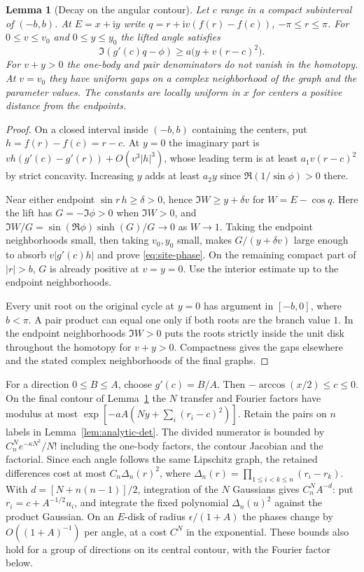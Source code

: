 \documentclass[11pt]{article}
\numberwithin{equation}{section}
\newtheorem{lemma}[theorem]{Lemma}
\theoremstyle{definition}
\newcommand{\ii}{\mathrm i}
\begin{document}
\begin{lemma}[Decay on the angular contour]\label{lem:site-contour}
Let $c$ range in a compact subinterval of $(-b,b)$. At $E=x+\ii y$
write $q=r+\ii v(f(r)-f(c))$, $-\pi\le r\le\pi$.
For $0\le v\le v_0$ and $0\le y\le y_0$ the lifted angle satisfies
\begin{equation}\label{eq:site-phase}
 \Im(g'(c)q-\phi)\ge a\bigl(y+v(r-c)^2\bigr).
\end{equation}
For $v+y>0$ the one-body and pair denominators do not vanish in the
homotopy. At $v=v_0$ they have uniform gaps on a complex neighborhood
of the graph and the parameter values. The constants are locally
uniform in $x$ for centers a positive distance from the endpoints.
\end{lemma}
\begin{proof}
On a closed interval inside $(-b,b)$ containing the centers, put
$h=f(r)-f(c)=r-c$. At $y=0$ the imaginary part is
$v h(g'(c)-g'(r))+O(v^3|h|^3)$, whose leading term is at least
$a_1v(r-c)^2$ by strict concavity. Increasing $y$ adds at least
$a_2y$ since $\Re(1/\sin\phi)>0$ there.

Near either endpoint $\sin r\,h\ge\delta>0$, hence
$\Im W\ge y+\delta v$ for $W=E-\cos q$. Here the lift has
$G=-\Im\phi>0$ when $\Im W>0$, and
$\Im W/G=\sin(\Re\phi)\sinh(G)/G\to0$ as $W\to1$.
Taking the endpoint neighborhoods small, then taking $v_0,y_0$ small,
makes $G/(y+\delta v)$ large enough to absorb $v|g'(c)h|$ and prove
\eqref{eq:site-phase}. On the remaining compact part of $|r|>b$,
$G$ is already positive at $v=y=0$. Use the interior estimate up
to the endpoint neighborhoods.

Every unit root on the original cycle at $y=0$ has argument in
$[-b,0]$, where $b<\pi$. A pair product can equal one only if both
roots are the branch value $1$. In the endpoint neighborhoods $\Im W>0$
puts the roots strictly inside the unit disk throughout the homotopy
for $v+y>0$. Compactness gives the gaps elsewhere and the stated
complex neighborhoods of the final graphs.
\end{proof}

For a direction $0\le B\le A$, choose $g'(c)=B/A$. Then
$-\arccos(x/2)\le c\le0$. On the final contour of
Lemma~\ref{lem:site-contour} the $N$ transfer and Fourier factors have
modulus at most $\exp[-aA(Ny+\sum_i(r_i-c)^2)]$.
Retain the pairs on $n$ labels in Lemma~\ref{lem:analytic-det}.
The divided numerator is bounded by $C_n^N e^{-\kappa N^2}/N!$
including the one-body factors, the contour Jacobian and the factorial.
Since each angle follows the same Lipschitz graph, the retained
differences cost at most $C_n\Delta_n(r)^2$, where
$\Delta_n(r)=\prod_{1\le i<k\le n}(r_i-r_k)$.
With $d=[N+n(n-1)]/2$, integration of the $N$ Gaussians gives
$C_n^N A^{-d}$: put $r_i=c+A^{-1/2}u_i$, and integrate the fixed
polynomial $\Delta_n(u)^2$ against the product Gaussian.
On an $E$-disk of radius $\epsilon/(1+A)$ the phases change by
$O((1+A)^{-1})$ per angle, at a cost $C^N$ in the exponential.
These bounds also hold for a group of directions on its central contour,
with the Fourier factor below.
\end{document}
